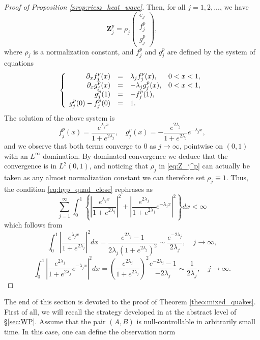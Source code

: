 \documentclass[10pt]{article}
\begin{document}
\begin{proof}[Proof of Proposition \ref{prop:riesz_heat_wave}]
Then, for all $j = 1,2,...$, we have
\begin{equation}\label{eq:Z_j^p}
\mathbf{Z}_j^p = \rho_j \left( \begin{array}{c}
e_j \\
f_j^p \\
g_j^p
\end{array} \right),
\end{equation}
where $\rho_j$ is a normalization constant, and $f_j^p$ and $g_j^p$ are defined by the system of equations
\[
\left\lbrace \begin{array}{rcl c}
\partial_x f_j^p(x) &=& \lambda_j f_j^p(x),&  0<x<1,\\
\partial_x g_j^p(x) &=& - \lambda_j g_j^p(x),& 0<x<1,\\
g_j^p(1) &=& - f_j^p(1), \\
g_j^p(0) - f_j^p(0) &=& 1.
\end{array}\right.
\]
The solution of the above system is
\[
f_j^p(x) = \frac{e^{\lambda_jx}}{1+ e^{2 \lambda_j}},\quad g_j^p(x) = - \frac{e^{2 \lambda_j}}{1+e^{2 \lambda_j}}e^{-\lambda_jx},
\]
and we observe that both terms converge to 0 as $j \rightarrow \infty$, pointwise on $(0,1)$ with an $L^\infty$ domination. By dominated convergence we deduce that the convergence is in $L^2(0,1)$, and noticing that $\rho_j$ in \eqref{eq:Z_j^p} can actually be taken as any almost normalization constant we can therefore set $\rho_j \equiv 1$. Thus, the condition \eqref{eq:hyp_quad_close} rephrases as 
\[
\sum_{j=1}^\infty \int_0^1 \left\lbrace \left| \frac{e^{\lambda_j x}}{1+e^{2 \lambda_j}} \right|^2 + \left| \frac{e^{2\lambda_j}}{1+e^{2 \lambda_j}} e^{-\lambda_jx}\right|^2 \right\rbrace dx < \infty
\]
which follows from 
\[
\int_0^1 \left| \frac{e^{\lambda_j x}}{1+e^{2 \lambda_j}} \right|^2 dx = \frac{e^{2 \lambda_j}-1}{2\lambda_j(1+e^{2\lambda_j})^2} \sim \frac{e^{-2 \lambda_j}}{2 \lambda_j},\quad j\rightarrow \infty,
\]
\[
\int_0^1   \left| \frac{e^{2\lambda_j}}{1+e^{2 \lambda_j}} e^{-\lambda_jx}\right|^2  dx = \left(\frac{e^{2 \lambda_j}}{1+e^{2 \lambda_j}}\right)^2 \frac{e^{-2\lambda_j}-1}{-2 \lambda_j} \sim \frac{1}{2\lambda_j},\quad j \rightarrow \infty.
\]
\end{proof}
The end of this section is devoted to the proof of Theorem \ref{theo:mixed_quakes}.  First of all, we will recall the strategy developed in \cite[Proposition 2.4]{lissy_douglas} at the abstract level of \S \ref{sec:WP}. Assume that the pair $(A,B)$ is null-controllable in arbitrarily small time. In this case, one can define the observation norm
\end{document}
